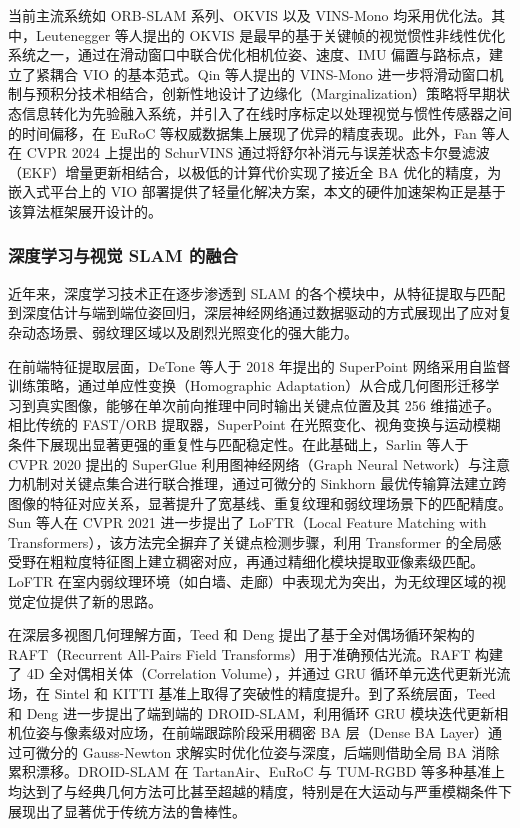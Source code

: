 当前主流系统如 ORB-SLAM 系列、OKVIS\cite{leutenegger2015keyframe} 以及 VINS-Mono\cite{qin2018vins} 均采用优化法。其中，Leutenegger 等人\cite{leutenegger2015keyframe}提出的 OKVIS 是最早的基于关键帧的视觉惯性非线性优化系统之一，通过在滑动窗口中联合优化相机位姿、速度、IMU 偏置与路标点，建立了紧耦合 VIO 的基本范式。Qin 等人\cite{qin2018vins}提出的 VINS-Mono 进一步将滑动窗口机制与预积分技术相结合，创新性地设计了边缘化（Marginalization）策略将早期状态信息转化为先验融入系统，并引入了在线时序标定\cite{qin2018online}以处理视觉与惯性传感器之间的时间偏移，在 EuRoC\cite{Burri25012016} 等权威数据集上展现了优异的精度表现。此外，Fan 等人\cite{fan2024schurvins}在 CVPR 2024 上提出的 SchurVINS 通过将舒尔补消元与误差状态卡尔曼滤波（EKF）增量更新相结合，以极低的计算代价实现了接近全 BA 优化的精度，为嵌入式平台上的 VIO 部署提供了轻量化解决方案，本文的硬件加速架构正是基于该算法框架展开设计的。

\subsubsection{深度学习与视觉 SLAM 的融合}

近年来，深度学习技术正在逐步渗透到 SLAM 的各个模块中，从特征提取与匹配到深度估计与端到端位姿回归，深层神经网络通过数据驱动的方式展现出了应对复杂动态场景、弱纹理区域以及剧烈光照变化的强大能力。

在前端特征提取层面，DeTone 等人\cite{detone2018superpoint}于 2018 年提出的 SuperPoint 网络采用自监督训练策略，通过单应性变换（Homographic Adaptation）从合成几何图形迁移学习到真实图像，能够在单次前向推理中同时输出关键点位置及其 256 维描述子。相比传统的 FAST/ORB 提取器，SuperPoint 在光照变化、视角变换与运动模糊条件下展现出显著更强的重复性与匹配稳定性。在此基础上，Sarlin 等人\cite{sarlin2020superglue}于 CVPR 2020 提出的 SuperGlue 利用图神经网络（Graph Neural Network）与注意力机制对关键点集合进行联合推理，通过可微分的 Sinkhorn 最优传输算法建立跨图像的特征对应关系，显著提升了宽基线、重复纹理和弱纹理场景下的匹配精度。Sun 等人\cite{sun2021loftr}在 CVPR 2021 进一步提出了 LoFTR（Local Feature Matching with Transformers），该方法完全摒弃了关键点检测步骤，利用 Transformer 的全局感受野在粗粒度特征图上建立稠密对应，再通过精细化模块提取亚像素级匹配。LoFTR 在室内弱纹理环境（如白墙、走廊）中表现尤为突出，为无纹理区域的视觉定位提供了新的思路。

在深层多视图几何理解方面，Teed 和 Deng\cite{teed2020raft} 提出了基于全对偶场循环架构的 RAFT（Recurrent All-Pairs Field Transforms）用于准确预估光流。RAFT 构建了 4D 全对偶相关体（Correlation Volume），并通过 GRU 循环单元迭代更新光流场，在 Sintel 和 KITTI 基准上取得了突破性的精度提升。到了系统层面，Teed 和 Deng\cite{zhu2020droid} 进一步提出了端到端的 DROID-SLAM，利用循环 GRU 模块迭代更新相机位姿与像素级对应场，在前端跟踪阶段采用稠密 BA 层（Dense BA Layer）通过可微分的 Gauss-Newton 求解实时优化位姿与深度，后端则借助全局 BA 消除累积漂移。DROID-SLAM 在 TartanAir、EuRoC 与 TUM-RGBD 等多种基准上均达到了与经典几何方法可比甚至超越的精度，特别是在大运动与严重模糊条件下展现出了显著优于传统方法的鲁棒性。

